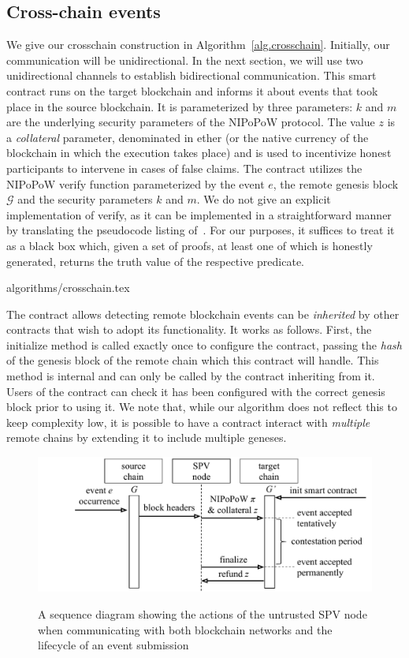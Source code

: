 \subsection*{Cross-chain events}

We give our \textsf{crosschain} construction in Algorithm~\ref{alg.crosschain}.
Initially, our communication will be unidirectional. In the next section, we
will use two unidirectional channels to establish bidirectional communication.
This smart contract runs on the target blockchain and informs it about events
that took place in the source blockchain. It is parameterized by three
parameters: $k$ and $m$ are the underlying security parameters of the NIPoPoW
protocol. The value $z$ is a \emph{collateral} parameter, denominated in ether
(or the native currency of the blockchain in which the execution takes place)
and is used to incentivize honest participants to intervene in cases of false
claims. The contract utilizes the NIPoPoW \textsf{verify} function parameterized
by the event $e$, the remote genesis block $\mathcal{G}$ and the security
parameters $k$ and $m$. We do not give an explicit implementation of
\textsf{verify}, as it can be implemented in a straightforward manner by
translating the pseudocode listing of~\cite{nipopows}. For our purposes, it
suffices to treat it as a black box which, given a set of proofs, at least one
of which is honestly generated, returns the truth value of the respective
predicate.

{algorithms/crosschain.tex}

The contract allows detecting remote blockchain events can be \emph{inherited}
by other contracts that wish to adopt its functionality. It works as follows.
First, the \textsf{initialize} method is called exactly once to configure the
contract, passing the \emph{hash} of the genesis block of the remote chain which
this contract will handle. This method is \textsf{internal} and can only be
called by the contract inheriting from it. Users of the contract can check  it
has been configured with the correct genesis block prior to using it. We note
that, while our algorithm does not reflect this to keep complexity low, it is
possible to have a contract interact with \emph{multiple} remote chains by
extending it to include multiple geneses.

\begin{figure}[H]
    \caption{A sequence diagram showing the actions of the untrusted SPV node
             when communicating with both blockchain networks and the lifecycle
             of an event submission}
    \centering
    \includegraphics[width=0.9 \columnwidth,keepaspectratio]{figures/sequence-diagram.pdf}
    \label{fig.sequence}
\end{figure}

